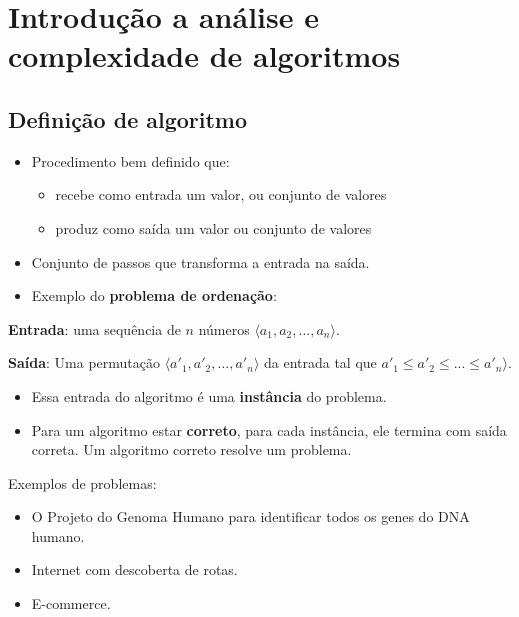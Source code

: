 \section{Introdução a análise e complexidade de algoritmos}

\subsection{Definição de algoritmo}

\begin{itemize}
\item Procedimento bem definido que:
	\begin{itemize}
	\item recebe como entrada um valor, ou conjunto de valores
	\item produz como saída um valor ou conjunto de valores
	\end{itemize}
\item Conjunto de passos que transforma a entrada na saída.
\item Exemplo do {\bf problema de ordenação}:
\end{itemize}

{\bf Entrada}: uma sequência de $n$ números $\langle a_1, a_2, ..., a_n \rangle$.

{\bf Saída}:  Uma permutação $\langle {a'}_1, {a'}_2, ..., {a'}_n \rangle$ da
entrada tal que ${a'}_1 \leq {a'}_2 \leq ... \leq {a'}_n \rangle$.

\begin{itemize}
\item Essa entrada do algoritmo é uma {\bf instância} do problema.
\item Para um algoritmo estar {\bf correto}, para cada instância, ele termina com saída 
correta. Um algoritmo correto \textsf{resolve} um problema. 
\end{itemize}

Exemplos de problemas:
\begin{itemize}
\item O Projeto do Genoma Humano para identificar todos os genes do DNA humano.
\item Internet com descoberta de rotas.
\item E-commerce.
\end{itemize}

